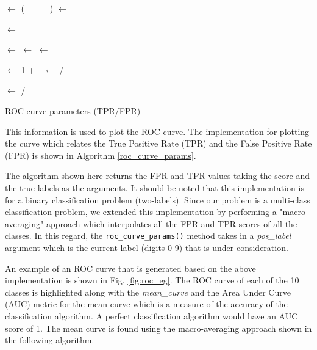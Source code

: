 \documentclass[10pt]{scrartcl}
\begin{document}
\begin{algorithm}[H]
 
       

\BlankLine

\tl $\leftarrow$ (\tl $==$ \pos)
\BlankLine
{}
\desc $\leftarrow$ \sort{\score}

\score $\leftarrow$ \score[\score]

\tl $\leftarrow$ \tl[\score]
\dis $\leftarrow$ \finddis{\score}
\BlankLine
{}
\tps $\leftarrow$ \cumsum{\tl}

\fps $\leftarrow$ 1 + \dis - \tps
\BlankLine
{}
\fpr $\leftarrow$ \fps / \fps[-1]

\tpr $\leftarrow$ \tps / \tps[-1] 
\caption{ROC curve parameters (TPR/FPR)}\label{roc_curve_params}
\end{algorithm}

This information is used to plot the ROC curve. The implementation for plotting the curve which relates the True Positive Rate (TPR) and the False Positive Rate (FPR) is shown in Algorithm \ref{roc_curve_params}.

The algorithm shown here returns the FPR and TPR values taking the score and the true labels as the arguments. It should be noted that this implementation is for a binary classification problem (two-labels). Since our problem is a multi-class classification problem, we extended this implementation by performing a "macro-averaging" approach which interpolates all the FPR and TPR scores of all the classes. In this regard, the \texttt{roc\_curve\_params()} method takes in a \textit{pos\_label} argument which is the current label (digits 0-9) that is under consideration.

An example of an ROC curve that is generated based on the above implementation is shown in Fig. \ref{fig:roc_eg}. The ROC curve of each of the 10 classes is highlighted along with the \textit{mean\_curve} and the Area Under Curve (AUC) metric for the mean curve which is a measure of the accuracy of the classification algorithm. A perfect classification algorithm would have an AUC score of 1. The mean curve is found using the macro-averaging approach shown in the following algorithm.
\end{document}

